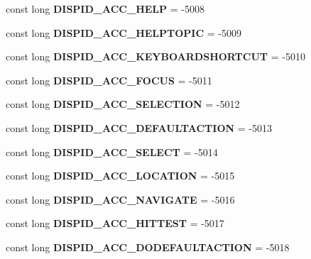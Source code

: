 \begin{DoxyCompactItemize}
const long {\bfseries D\+I\+S\+P\+I\+D\+\_\+\+A\+C\+C\+\_\+\+H\+E\+LP} = -\/5008
\item 
\mbox{\label{interface_i_accessible_a8b9a2b9b4e10d5875d337a424a688c22}} 
const long {\bfseries D\+I\+S\+P\+I\+D\+\_\+\+A\+C\+C\+\_\+\+H\+E\+L\+P\+T\+O\+P\+IC} = -\/5009
\item 
\mbox{\label{interface_i_accessible_a215935b19bf28f6e1a5a6a95b233dd9d}} 
const long {\bfseries D\+I\+S\+P\+I\+D\+\_\+\+A\+C\+C\+\_\+\+K\+E\+Y\+B\+O\+A\+R\+D\+S\+H\+O\+R\+T\+C\+UT} = -\/5010
\item 
\mbox{\label{interface_i_accessible_a64a32e472b6dcdb6474623349c0cf1ad}} 
const long {\bfseries D\+I\+S\+P\+I\+D\+\_\+\+A\+C\+C\+\_\+\+F\+O\+C\+US} = -\/5011
\item 
\mbox{\label{interface_i_accessible_ae92433e47d0b3dc6e452ec82729b546b}} 
const long {\bfseries D\+I\+S\+P\+I\+D\+\_\+\+A\+C\+C\+\_\+\+S\+E\+L\+E\+C\+T\+I\+ON} = -\/5012
\item 
\mbox{\label{interface_i_accessible_a8e9d0fe105b56450d72a3c4c37a2c01a}} 
const long {\bfseries D\+I\+S\+P\+I\+D\+\_\+\+A\+C\+C\+\_\+\+D\+E\+F\+A\+U\+L\+T\+A\+C\+T\+I\+ON} = -\/5013
\item 
\mbox{\label{interface_i_accessible_ae0e34567cb621aaa0db0ff9afc5c2ab1}} 
const long {\bfseries D\+I\+S\+P\+I\+D\+\_\+\+A\+C\+C\+\_\+\+S\+E\+L\+E\+CT} = -\/5014
\item 
\mbox{\label{interface_i_accessible_aec3c4dc6be289e8ea9f4d7cc08a6c1fb}} 
const long {\bfseries D\+I\+S\+P\+I\+D\+\_\+\+A\+C\+C\+\_\+\+L\+O\+C\+A\+T\+I\+ON} = -\/5015
\item 
\mbox{\label{interface_i_accessible_a19eb2a43e642476f74a6a4dfcafc7244}} 
const long {\bfseries D\+I\+S\+P\+I\+D\+\_\+\+A\+C\+C\+\_\+\+N\+A\+V\+I\+G\+A\+TE} = -\/5016
\item 
\mbox{\label{interface_i_accessible_abd11a66cff709626475027c385dbc2b1}} 
const long {\bfseries D\+I\+S\+P\+I\+D\+\_\+\+A\+C\+C\+\_\+\+H\+I\+T\+T\+E\+ST} = -\/5017
\item 
\mbox{\label{interface_i_accessible_a57887b5570de3213d2625b9ce5046dce}} 
const long {\bfseries D\+I\+S\+P\+I\+D\+\_\+\+A\+C\+C\+\_\+\+D\+O\+D\+E\+F\+A\+U\+L\+T\+A\+C\+T\+I\+ON} = -\/5018
\end{DoxyCompactItemize}
